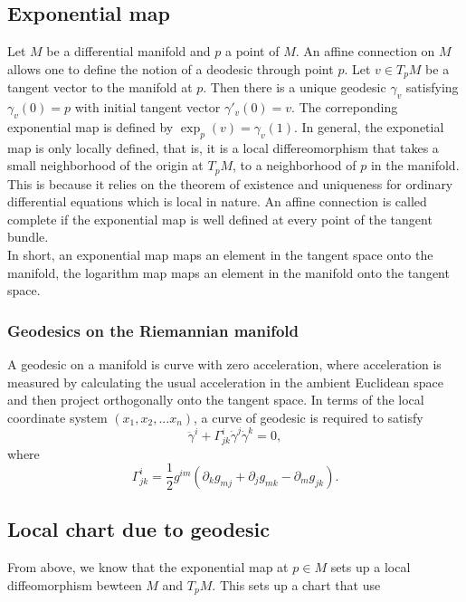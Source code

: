 \begin{refsection}
\subsection{Exponential map}
Let $M$ be a differential manifold and $p$ a point of $M$. An affine connection on $M$ allows one to define the notion of a deodesic through point $p$. Let $v \in T_pM$ be a tangent vector to the manifold at $p$. Then there is a unique geodesic $\gamma_v$ satisfying $\gamma_v(0) = p$ with initial tangent vector $\gamma'_v(0) = v$. The correponding exponential map is defined by $\exp_p(v) = \gamma_v(1)$. In general, the exponetial map is only locally defined, that is, it is a local differeomorphism\cite{Pennec2006} that takes a small neighborhood of the origin at $T_pM$, to a neighborhood of $p$ in the manifold. This is because it relies on the theorem of existence and uniqueness for ordinary differential equations which is local in nature. An affine connection is called complete if the exponential map is well defined at every point of the tangent bundle. \\
In short, an exponential map maps an element in the tangent space onto the manifold, the logarithm map maps an element in the manifold onto the tangent space. 


\begin{remark}
	
\end{remark}


\subsubsection{Geodesics on the Riemannian manifold}
\begin{definition}
A geodesic on a manifold is curve with zero acceleration, where acceleration is measured by calculating the usual acceleration in the ambient Euclidean space and then project orthogonally onto the tangent space.	
In terms of the local coordinate system $(x_1,x_2,...x_n)$, a curve of geodesic is required to satisfy $$\ddot{\gamma}^i + \Gamma^i_{jk}\dot{\gamma}^j\dot{\gamma}^k = 0, $$ 
where $$\Gamma^i_{jk} = \frac{1}{2} g^{im}(\partial_k g_{mj} + \partial_j g_{mk} - \partial_m g_{jk}).$$
\end{definition}
 



\subsection{Local chart due to geodesic }
\cite{Pennec2006}From above, we know that the exponential map at $p \in M$ sets up a local diffeomorphism bewteen $M$ and $T_pM$. This sets up a chart that use 


\end{refsection}
